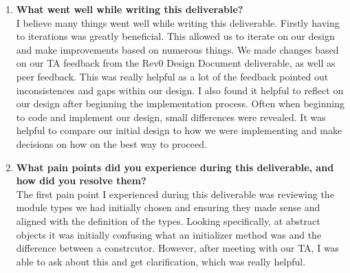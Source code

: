 \documentclass[12pt, titlepage]{article}
\begin{document}
\begin{enumerate}
  \item \textbf{What went well while writing this deliverable?}\\
  I believe many things went well while writing this deliverable. Firstly having to iterations was greatly beneficial. 
  This allowed us to iterate on our design and make improvements based on numerous things. 
  We made changes based on our TA feedback from the Rev0 Design Document deliverable, as well as peer feedback. 
  This was really helpful as a lot of the feedback pointed out inconsistences and gaps within our design.
  I also found it helpful to reflect on our design after beginning the implementation process. Often when beginning to code 
  and implement our design, small differences were revealed. It was helpful to compare our initial design to how we were implementing and make decisions on how on the best way to proceed. 
  \item \textbf{What pain points did you experience during this deliverable, and how did you resolve them?}\\
  The first pain point I experienced during this deliverable was reviewing the module types we had initially chosen
  and ensuring they made sense and aligned with the definition of the types. 
  Looking specifically, at abstract objects it was initially confusing what an initializer method was and the difference between a constrcutor. However, 
  after meeting with our TA, I was able to ask about this and get clarification, which was really helpful.

\end{enumerate}
\end{document}
